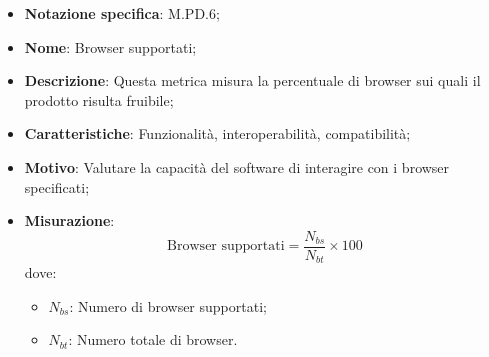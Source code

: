\begin{itemize}
    \item \textbf{Notazione specifica}: M.PD.6;
    \item \textbf{Nome}: Browser supportati;
    \item \textbf{Descrizione}: Questa metrica misura la percentuale di browser sui quali il prodotto risulta fruibile;
    \item \textbf{Caratteristiche}: Funzionalità, interoperabilità, compatibilità;
    \item \textbf{Motivo}: Valutare la capacità del software di interagire con i browser specificati;
    \item \textbf{Misurazione}:
    \[
    \text{Browser supportati} = \frac{N_{bs}}{N_{bt}} \times 100
    \]
    dove:
    \begin{itemize}
        \item $N_{bs}$: Numero di browser supportati;
        \item $N_{bt}$: Numero totale di browser.
    \end{itemize}
\end{itemize}
